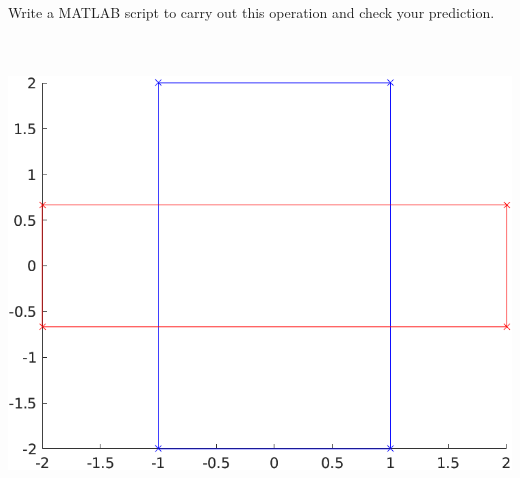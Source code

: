 Write a MATLAB script to carry out this operation and check your prediction.

\begin{solution} \ \\
\ \\
\includegraphics{img/e7p2.png}
\end{solution}
